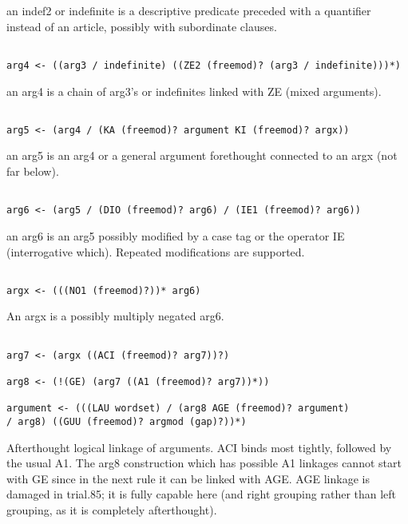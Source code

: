 \documentclass[12pt]{article}
\begin{document}
an indef2 or indefinite is a descriptive predicate preceded with a quantifier instead of an article, possibly with
subordinate clauses.

\begin{verbatim}

arg4 <- ((arg3 / indefinite) ((ZE2 (freemod)? (arg3 / indefinite)))*)

\end{verbatim}

an arg4 is a chain of arg3's or indefinites linked with ZE (mixed arguments).

\begin{verbatim}

arg5 <- (arg4 / (KA (freemod)? argument KI (freemod)? argx))

\end{verbatim}

an arg5 is an arg4 or a general argument forethought connected to an argx (not far below).

\begin{verbatim}

arg6 <- (arg5 / (DIO (freemod)? arg6) / (IE1 (freemod)? arg6))

\end{verbatim}

an arg6 is an arg5 possibly modified by a case tag or the operator IE (interrogative which).  Repeated modifications
are supported.

\begin{verbatim}

argx <- (((NO1 (freemod)?))* arg6)

\end{verbatim}

An argx is a possibly multiply negated arg6.

\begin{verbatim}

arg7 <- (argx ((ACI (freemod)? arg7))?)

arg8 <- (!(GE) (arg7 ((A1 (freemod)? arg7))*))

argument <- (((LAU wordset) / (arg8 AGE (freemod)? argument) 
/ arg8) ((GUU (freemod)? argmod (gap)?))*)

\end{verbatim}

Afterthought logical linkage of arguments.  ACI binds most tightly, followed by the usual A1.  The arg8 construction
which has possible A1 linkages cannot start with GE since in the next rule it can be linked with AGE.  AGE linkage is damaged in
trial.85; it is fully capable here (and right grouping rather than left grouping, as it is completely afterthought).
\end{document}
